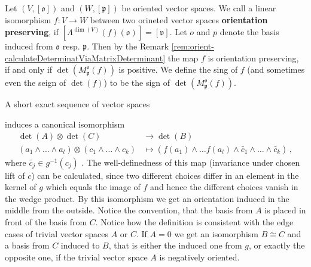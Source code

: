 \begin{definition} \label{def:oeient-SignOfAAbstractLinearMap}
    Let $(V,[\mathfrak{o}])$ and $(W,[\mathfrak{p}])$ be oriented vector spaces. We call a linear isomorphism $f:V\to W$ between two orineted vector spaces \textbf{orientation preserving}, if  $[\Lambda^{\dim(V)}(f)(\mathfrak{o})]=[\mathfrak{v}]$. Let $o$ and $p$ denote the basis induced from $\mathfrak{o}$ resp. $\mathfrak{p}$. Then by the Remark \ref{rem:orient-calculateDeterminatViaMatrixDeterminant} the map $f$ is orientation preserving, if and only if $\det(M^\mathfrak{o}_\mathfrak{p}(f))$ is positive. We define the sing of $f$ (and sometimes even the seign of $\det(f)$) to be the sign of $\det(M^\mathfrak{o}_\mathfrak{p}(f))$.
\end{definition}
\begin{definition}
A short exact sequence of vector spaces 
\begin{center}

\end{center}
induces a canonical isomorphism 
	\begin{align*}
		 \det(A)\otimes \det(C)& \to \det(B)\\
		 (a_1\wedge \dots\wedge a_l) \otimes (c_1\wedge \dots \wedge c_k) &\mapsto (f(a_1)\wedge \dots f(a_l)\wedge \tilde{c_1}\wedge \dots \wedge \tilde{c_k})\, ,
	\end{align*} where $\tilde{c_j}\in g^{-1}(c_j)$ . The well-definedness of this map (invariance under chosen lift of $c$) can be calculated, since two different choices differ in an element in the kernel of $g$ which equals the image of $f$ and hence the different choices vanish in the wedge product. By this isomorphism we get an orientation induced in the middle from the outside. Notice the convention, that the basis from $A$ is placed in front of the basis from $C$. 
	Notice how the definition is consistent with the edge cases of trivial vector spaces $A$ or $C$. If $A=0$ we get an isomorphism $B\cong C$ and a basis from $C$ induced to $B$, that is either the induced one from $g$, or exactly the opposite one, if the trivial vector space $A$ is negatively oriented.
\end{definition}
